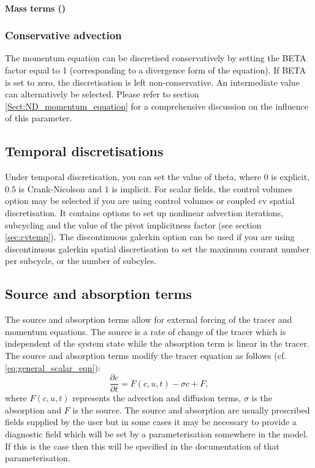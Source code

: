 \paragraph{Mass terms ()}

\subsubsection{Conservative advection}

The momentum equation can be discretised conservatively by setting the
BETA factor equal to 1 (corresponding to a divergence form of the
equation). If BETA is set to zero, the discretisation is left
non-conservative. An intermediate value can alternatively be
selected. Please refer to section \ref{Sect:ND_momentum_equation} for a comprehensive discussion on the influence of this parameter.


\subsection{Temporal discretisations}
\label{sect:configuring_fluidity_temporal_discretisation}
Under temporal discretisation, you can set the value of theta, where $0$ is explicit, $0.5$ is Crank-Nicolson and $1$ is implicit. For scalar fields, the control volumes option may be selected if you are using control volumes or coupled cv spatial discretisation.  It contains options to set up nonlinear advection iterations, subcycling and the value of the pivot implicitness factor (see section \ref{sec:cvtemp}). The discontinuous galerkin option can be used if you are using discontinuous galerkin spatial discretisation to set the maximum courant number per subcycle, or the number of subcyles. 

\subsection{Source and absorption terms}\label{Sect:Source}

The source and absorption terms allow for external forcing of the tracer and
momentum equations. The source is a rate of change of the tracer which is
independent of the system state while the absorption term is linear in the
tracer. The source and absorption terms modify the tracer
equation as follows (cf. \eqref{eq:general_scalar_eqn}):
\begin{equation}
  \frac{\partial c}{\partial t} = F(c,u,t) - \sigma c + F,
\end{equation}
where $F(c,u,t)$ represents the advection and diffusion terms, $\sigma$ is the
absorption and $F$ is the source. The source and absorption are usually
prescribed fields supplied by the user but in some cases it may be necessary
to provide a diagnostic field which will be set by a parameterisation
somewhere in the model. If this is the case then this will be specified in
the documentation of that parameterisation.

